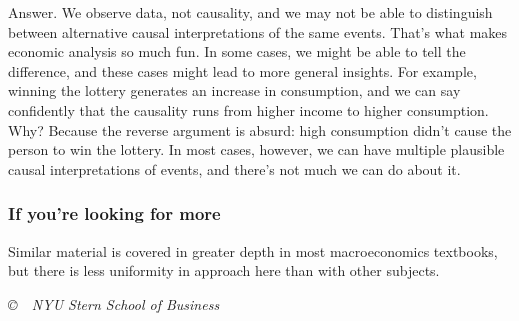 \documentclass[letterpaper,12pt]{article}
\begin{document}
\begin{enumerate}
Answer.  We observe data, not causality,
and we may not be able to distinguish between
alternative causal interpretations of the same events.
That's what makes economic analysis so much fun.
In some cases, we might be able to tell the difference,
and these cases might lead to more general insights.
For example, winning the lottery generates an increase in consumption,
and we can say confidently that the causality runs from
higher income to higher consumption.
Why?  Because the reverse argument is absurd:
high consumption didn't cause the person to win the lottery.
In most cases, however,
we can have multiple plausible causal interpretations of events,
and there's not much we can do about it.


\end{enumerate}

\subsubsection*{If you're looking for more} 

Similar material is covered in greater depth
in most macroeconomics textbooks, 
but there is less uniformity in approach here than with other subjects. 
\vfill \centerline{\it \copyright \ \number\year \ NYU Stern
School of Business}
\end{document}
